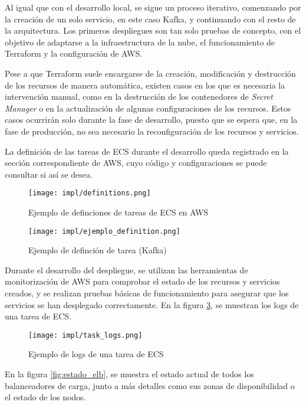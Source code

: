 Al igual que con el desarrollo local, se sigue un proceso iterativo, comenzando
por la creación de un solo servicio, en este caso Kafka, y continuando con el
resto de la arquitectura. Los primeros despliegues son tan solo pruebas de
concepto, con el objetivo de adaptarse a la infraestructura de la nube, el
funcionamiento de Terraform y la configuración de AWS.

Pese a que Terraform suele encargarse de la creación, modificación y destrucción
de los recursos de manera automática, existen casos en los que es necesaria la
intervención manual, como en la destrucción de los contenedores de
\textit{Secret Manager} o en la actualización de algunas configuraciones de los
recursos. Estos casos ocurrirán solo durante la fase de desarrollo, puesto que
se espera que, en la fase de producción, no sea necesario la reconfiguración de
los recursos y servicios.

La definición de las tareas de ECS durante el desarrollo queda registrado en la
sección correspondiente de AWS, cuyo código y configuraciones se puede consultar
si así se desea.

\begin{figure}[H]
	\centering
	\texttt{[image: impl/definitions.png]}
	\caption{Ejemplo de definciones de tareas de ECS en AWS}
	\label{fig:definitions}
\end{figure}

\begin{figure}[H]
	\centering
	\texttt{[image: impl/ejemplo\_definition.png]}
	\caption{Ejemplo de definción de tarea (Kafka)}
	\label{fig:definition}
\end{figure}

Durante el desarrollo del despliegue, se utilizan las herramientas de
monitorización de AWS para comprobar el estado de los recursos y servicios
creados, y se realizan pruebas básicas de funcionamiento para asegurar que los
servicios se han desplegado correctamente. En la figura \ref{fig:task_logs}, se muestran
los logs de una tarea de ECS.

\begin{figure}[H]
	\centering
	\texttt{[image: impl/task\_logs.png]}
	\caption{Ejemplo de logs de una tarea de ECS}
	\label{fig:task_logs}
\end{figure}

En la figura \ref{fig:estado_elb}, se muestra el estado actual de todos los balanceadores
de carga, junto a más detalles como sus zonas de disponibilidad o el estado de
los nodos.

